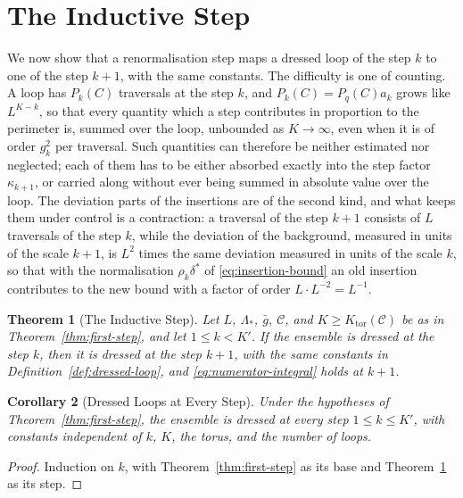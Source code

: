\documentclass[11pt]{preprint}
\numberwithin{equation}{section}
\newtheorem{theorem}{Theorem}[section]
\newtheorem{corollary}[theorem]{Corollary}
\theoremstyle{definition}
\theoremstyle{remark}
\theoremstyle{plain}
\begin{document}
\section{The Inductive Step}\label{sec:inductive-class}

We now show that a renormalisation step maps a dressed loop of the step $k$ to one of the step $k + 1$, with the same constants. The difficulty is one of counting. A loop has $P_k(C)$ traversals at the step $k$, and $P_k(C) = P_q(C)a_k$ grows like $L^{K-k}$, so that every quantity which a step contributes in proportion to the perimeter is, summed over the loop, unbounded as $K \to \infty$, even when it is of order $g_k^2$ per traversal. Such quantities can therefore be neither estimated nor neglected; each of them has to be either absorbed exactly into the step factor $\kappa_{k+1}$, or carried along without ever being summed in absolute value over the loop. The deviation parts of the insertions are of the second kind, and what keeps them under control is a contraction: a traversal of the step $k + 1$ consists of $L$ traversals of the step $k$, while the deviation of the background, measured in units of the scale $k + 1$, is $L^2$ times the same deviation measured in units of the scale $k$, so that with the normalisation $\rho_k\delta^*$ of \eqref{eq:insertion-bound} an old insertion contributes to the new bound with a factor of order $L \cdot L^{-2} = L^{-1}$.

\begin{theorem}[The Inductive Step]\label{thm:inductive-step}
Let $L$, $\Lambda_*$, $\bar g$, $\mathcal C$, and $K \geq K_{\mathrm{tor}}(\mathcal C)$ be as in Theorem~\ref{thm:first-step}, and let $1 \leq k < K'$. If the ensemble is dressed at the step $k$, then it is dressed at the step $k + 1$, with the same constants in Definition~\ref{def:dressed-loop}, and \eqref{eq:numerator-integral} holds at $k + 1$.
\end{theorem}

\begin{corollary}[Dressed Loops at Every Step]\label{cor:dressed-every-step}
Under the hypotheses of Theorem~\ref{thm:first-step}, the ensemble is dressed at every step $1 \leq k \leq K'$, with constants independent of $k$, $K$, the torus, and the number of loops.
\end{corollary}

\begin{proof}
Induction on $k$, with Theorem~\ref{thm:first-step} as its base and Theorem~\ref{thm:inductive-step} as its step.
\end{proof}
\end{document}
